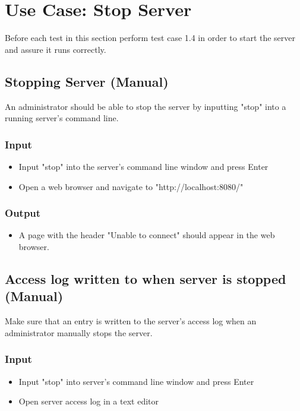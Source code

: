 \documentclass[a4paper, 12pt]{article}
\begin{document}
\newpage
\section{Use Case: Stop Server}

Before each test in this section perform test case 1.4 in order to start the server and assure it runs correctly.

\subsection{Stopping Server (Manual)}

An administrator should be able to stop the server by inputting "stop" into a running server's command line.

\subsubsection{Input}
\begin{itemize}
\item Input "stop" into the server's command line window and press Enter
\item Open a web browser and navigate to "http://localhost:8080/"
\end{itemize}

\subsubsection{Output}
\begin{itemize}
\item A page with the header "Unable to connect" should appear in the web browser.
\end{itemize}


\subsection{Access log written to when server is stopped (Manual)}

Make sure that an entry is written to the server's access log when an administrator manually stops the server.

\subsubsection{Input}
\begin{itemize}
\item Input "stop" into server's command line window and press Enter
\item Open server access log in a text editor
\end{itemize}
\end{document}
